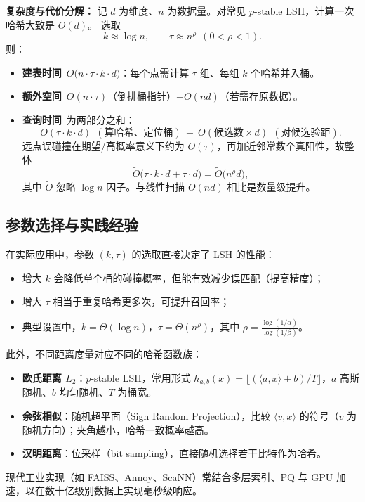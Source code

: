 \documentclass[lang=cn,newtx,10pt,scheme=chinese,chinesefont=nofont,citestyle=gb7714-2015, bibstyle=gb7714-2015]{elegantbook}
\begin{document}
\begin{refsection}
\quad

\textbf{复杂度与代价分解：}\quad
记 $d$ 为维度、$n$ 为数据量。对常见 $p$-stable LSH，计算一次哈希大致是 $O(d)$。
选取
\[
k\approx \log n,\qquad \tau\approx n^\rho\ \ (0<\rho<1).
\]
则：
\begin{itemize}
  \item \textbf{建表时间}\ $O\big(n\cdot \tau \cdot k \cdot d\big)$：每个点需计算 $\tau$ 组、每组 $k$ 个哈希并入桶。
  \item \textbf{额外空间}\ $O(n\cdot \tau)$（倒排桶指针）$+O(nd)$（若需存原数据）。
  \item \textbf{查询时间}\ 为两部分之和：
  \[
  O(\tau\cdot k\cdot d)\ \ (\text{算哈希、定位桶})
  \ +\ 
  O(\text{候选数}\times d)\ \ (\text{对候选验距}).
  \]
  远点误碰撞在期望/高概率意义下约为 $O(\tau)$，再加近邻常数个真阳性，故整体
  \[
  \tilde O\big(\tau\cdot k\cdot d+\tau\cdot d\big)=\tilde O\big(n^\rho d\big),
  \]
  其中 $\tilde O$ 忽略 $\log n$ 因子。与线性扫描 $O(nd)$ 相比是数量级提升。
\end{itemize}

\subsection{参数选择与实践经验}
在实际应用中，参数 $(k,\tau)$ 的选取直接决定了 LSH 的性能：
\begin{itemize}
  \item 增大 $k$ 会降低单个桶的碰撞概率，但能有效减少误匹配（提高精度）；
  \item 增大 $\tau$ 相当于重复哈希更多次，可提升召回率；
  \item 典型设置中，$k=\Theta(\log n)$，$\tau=\Theta(n^{\rho})$，其中 $\rho=\frac{\log(1/\alpha)}{\log(1/\beta)}$。
\end{itemize}
此外，不同距离度量对应不同的哈希函数族：
\begin{itemize}
  \item \textbf{欧氏距离 $L_2$}：$p$-stable LSH，常用形式 $h_{a,b}(x)=\lfloor(\langle a,x\rangle+b)/T\rfloor$，$a$ 高斯随机、$b$ 均匀随机、$T$ 为桶宽。
  \item \textbf{余弦相似}：随机超平面（Sign Random Projection），比较 $\langle v,x\rangle$ 的符号（$v$ 为随机方向）；夹角越小，哈希一致概率越高。
  \item \textbf{汉明距离}：位采样（bit sampling），直接随机选择若干比特作为哈希。
\end{itemize}
现代工业实现（如 FAISS、Annoy、ScaNN）常结合多层索引、PQ 与 GPU 加速，以在数十亿级别数据上实现毫秒级响应。



\end{refsection}
\end{document}
